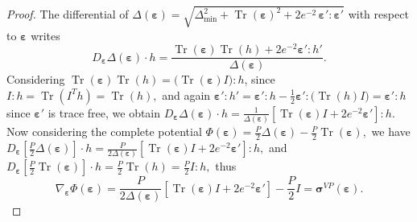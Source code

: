 \documentclass[11pt]{article}
\newcommand{\sig}{\boldsymbol{\sigma}}
\newcommand{\beps}{\boldsymbol{\varepsilon}}
\begin{document}
\begin{proof}
The differential of $\Delta(\beps)=
\sqrt{\Delta_{\min}^2+\operatorname{Tr}(\beps)^2+2e^{-2}\,\beps':\beps'}$ with respect to $\beps$ writes
\begin{equation*}
D_{\beps} \Delta(\beps)\cdot h=
\frac{\operatorname{Tr}(\beps)\operatorname{Tr}(h)
+2e^{-2}\beps':h'}{\Delta(\beps)}.
\end{equation*}
Considering $\operatorname{Tr}(\beps)\operatorname{Tr}(h)
=\bigl(\operatorname{Tr}(\beps)I\bigr):h$,
since $I:h=\operatorname{Tr}(I^T h)=\operatorname{Tr}(h), $ and again
$
\beps':h'=\beps':h-\frac12 \beps':\bigl(\operatorname{Tr}(h)I\bigr) = \beps':h
$ since $\beps'$ is trace free, we obtain
$D_{\beps} \Delta(\beps)\cdot h
=
\frac{1}{\Delta(\beps)}
\left[
\operatorname{Tr}(\beps)I
+
2e^{-2}\beps'
\right]:h$. 
Now considering the complete potential  $
\Phi(\beps)
=
\frac{P}{2}\Delta(\beps)
-
\frac{P}{2}\operatorname{Tr}(\beps),
$
we have
$
D_{\beps}\left[
\frac{P}{2}\Delta(\beps)
\right]\cdot h=
\frac{P}{2\Delta(\beps)}
\left[
\operatorname{Tr}(\beps)I+2e^{-2}\beps'
\right]:h,
$ and 
$D_{\beps}\left[
\frac{P}{2}\operatorname{Tr}(\beps)
\right]\cdot h=\frac{P}{2}\operatorname{Tr}(h)=
\frac{P}{2}I:h,
$  thus
\begin{equation}
\nabla_{\beps} \Phi(\beps)
=\frac{P}{2\Delta(\beps)}\left[\operatorname{Tr}(\beps)I
+2e^{-2}\beps'\right]-\frac{P}{2}I = \sig^{VP}(\beps).
\end{equation}
\end{proof}
\end{document}
